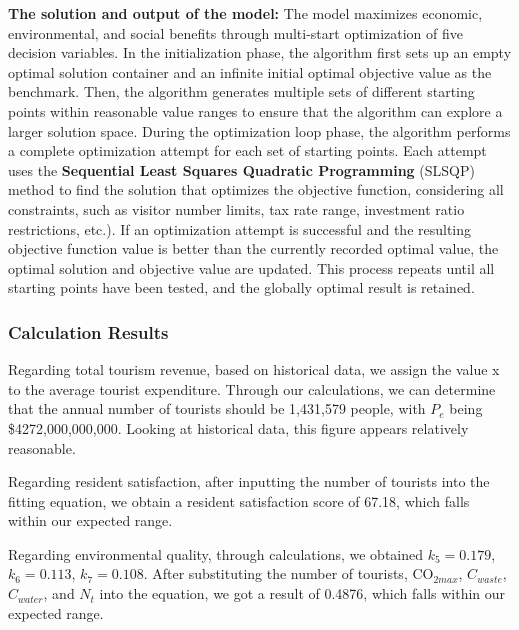 \documentclass[12pt]{article}  %
\begin{document}
\textbf{The solution and output of the model:} The model maximizes economic, environmental, and social benefits through multi-start optimization of five decision variables. In the initialization phase, the algorithm first sets up an empty optimal solution container and an infinite initial optimal objective value as the benchmark. Then, the algorithm generates multiple sets of different starting points within reasonable value ranges to ensure that the algorithm can explore a larger solution space. During the optimization loop phase, the algorithm performs a complete optimization attempt for each set of starting points. Each attempt uses the \textbf{Sequential Least Squares Quadratic Programming} (SLSQP) method to find the solution that optimizes the objective function, considering all constraints, such as visitor number limits, tax rate range, investment ratio restrictions, etc.). If an optimization attempt is successful and the resulting objective function value is better than the currently recorded optimal value, the optimal solution and objective value are updated. This process repeats until all starting points have been tested, and the globally optimal result is retained.

\subsubsection{Calculation Results}
Regarding total tourism revenue, based on historical data, we assign the value x to the average tourist expenditure. Through our calculations, we can determine that the annual number of tourists should be 1,431,579 people, with $P_e$ being \$4272,000,000,000. Looking at historical data, this figure appears relatively reasonable.

Regarding resident satisfaction, after inputting the number of tourists into the fitting equation, we obtain a resident satisfaction score of 67.18, which falls within our expected range.

Regarding environmental quality, through calculations, we obtained $k_5 = 0.179$, $k_6 = 0.113$, $k_7 = 0.108$. After substituting the number of tourists, $\text{CO}_{2max}$, $C_{waste}$, $C_{water}$, and $N_t$ into the equation, we got a result of 0.4876, which falls within our expected range.
\end{document}
